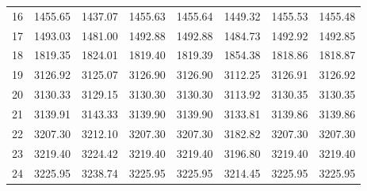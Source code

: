 \documentclass[10pt,oneside]{article}
\begin{document}
\begin{table}[h!]
\begin{tabular}{cccccccc}
16 &   1455.65 & 1437.07 & 1455.63 & 1455.64 &      1449.32 & 1455.53 & 1455.48 \\
17 &   1493.03 & 1481.00 & 1492.88 & 1492.88 &      1484.73 & 1492.92 & 1492.85 \\
18 &   1819.35 & 1824.01 & 1819.40 & 1819.39 &      1854.38 & 1818.86 & 1818.87 \\
19 &   3126.92 & 3125.07 & 3126.90 & 3126.90 &      3112.25 & 3126.91 & 3126.92 \\
20 &   3130.33 & 3129.15 & 3130.30 & 3130.30 &      3113.92 & 3130.35 & 3130.35 \\
21 &   3139.91 & 3143.33 & 3139.90 & 3139.90 &      3133.81 & 3139.86 & 3139.86 \\
22 &   3207.30 & 3212.10 & 3207.30 & 3207.30 &      3182.82 & 3207.30 & 3207.30 \\
23 &   3219.40 & 3224.42 & 3219.40 & 3219.40 &      3196.80 & 3219.40 & 3219.40 \\
24 &   3225.95 & 3238.74 & 3225.95 & 3225.95 &      3214.45 & 3225.95 & 3225.95 \\
\bottomrule
\end{tabular}
\end{table}

\clearpage
\end{document}
